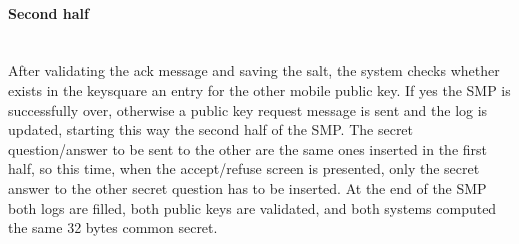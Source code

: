 \paragraph{Second half} \hspace{0pt} \\
After validating the ack message and saving the salt, the  system checks whether exists in the keysquare an entry for the other mobile public key. If yes the SMP is successfully over, otherwise a public key request message is sent and the log is updated, starting this way the second half of the SMP. The secret question/answer to be sent to the other are the same ones inserted in the first half, so this time, when the accept/refuse screen is presented, only the secret answer to the other secret question has to be inserted. At the end of the SMP both logs are filled, both public keys are validated, and both systems computed the same 32 bytes common secret.